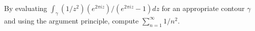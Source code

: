 By evaluating $\int_{\gamma}(1/z^2)(e^{2\pi i z})/(e^{2\pi i z}-1)dz$
for an appropriate contour $\gamma$ and using the argument principle,
compute $\sum_{n=1}^{\infty}1/n^2$.
